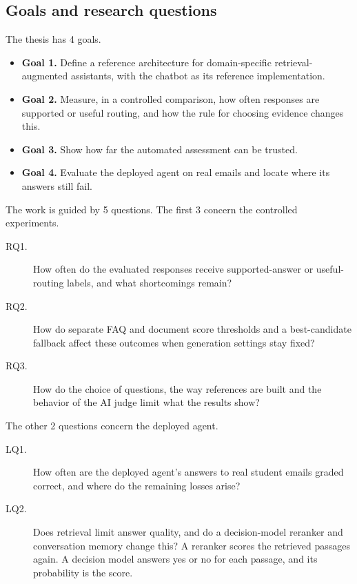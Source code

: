 \subsection{Goals and research questions}

The thesis has 4 goals.

\begin{itemize}
  \item \textbf{Goal 1.} Define a reference architecture for domain-specific retrieval-augmented assistants, with the chatbot as its reference implementation.
  \item \textbf{Goal 2.} Measure, in a controlled comparison, how often responses are supported or useful routing, and how the rule for choosing evidence changes this.
  \item \textbf{Goal 3.} Show how far the automated assessment can be trusted.
  \item \textbf{Goal 4.} Evaluate the deployed agent on real emails and locate where its answers still fail.
\end{itemize}

The work is guided by 5 questions. The first 3 concern the controlled experiments.

\begin{description}
  \item[RQ1.] How often do the evaluated responses receive supported-answer or useful-routing labels, and what shortcomings remain?
  \item[RQ2.] How do separate FAQ and document score thresholds and a best-candidate fallback affect these outcomes when generation settings stay fixed?
  \item[RQ3.] How do the choice of questions, the way references are built and the behavior of the AI judge limit what the results show?
\end{description}

The other 2 questions concern the deployed agent.

\begin{description}
  \item[LQ1.] How often are the deployed agent's answers to real student emails graded correct, and where do the remaining losses arise?
  \item[LQ2.] Does retrieval limit answer quality, and do a decision-model reranker and conversation memory change this? A reranker scores the retrieved passages again. A decision model answers yes or no for each passage, and its probability is the score.
\end{description}

